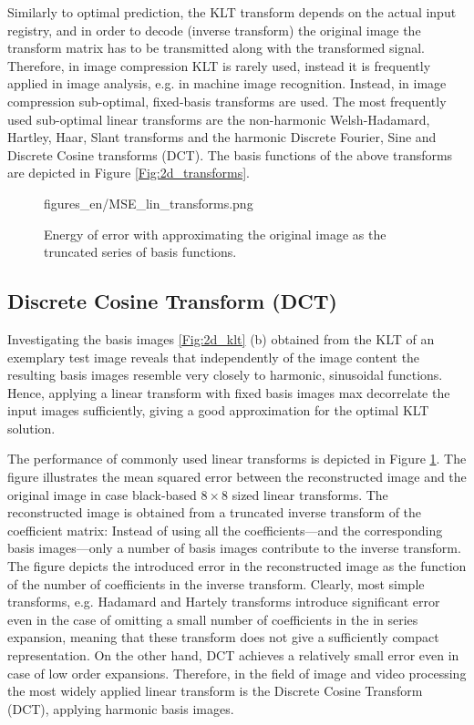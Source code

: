 \vspace{3mm}
Similarly to optimal prediction, the KLT transform depends on the actual input registry, and in order to decode (inverse transform) the original image the transform matrix has to be transmitted along with the transformed signal.
Therefore, in image compression KLT is rarely used, instead it is frequently applied in image analysis, e.g. in machine image recognition.
Instead, in image compression sub-optimal, fixed-basis transforms are used.
The most frequently used sub-optimal linear transforms are the non-harmonic Welsh-Hadamard, Hartley, Haar, Slant transforms and the harmonic Discrete Fourier, Sine and Discrete Cosine transforms (DCT).
The basis functions of the above transforms are depicted in Figure \ref{Fig:2d_transforms}.


\begin{figure}[h!]
	\centering
	\begin{overpic}[width = 0.8\columnwidth ]{figures_en/MSE_lin_transforms.png}
	\end{overpic}
	\caption{Energy of error with approximating the original image as the truncated series of basis functions.}
	\label{Fig:MSE}
\end{figure}

\subsection{Discrete Cosine Transform (DCT)}

Investigating the basis images \ref{Fig:2d_klt} (b) obtained from the KLT of an exemplary test image reveals that independently of the image content the resulting basis images resemble very closely to harmonic, sinusoidal functions.
Hence, applying a linear transform with fixed basis images max decorrelate the input images sufficiently, giving a good approximation for the optimal KLT solution.

The performance of commonly used linear transforms is depicted in Figure \ref{Fig:MSE}.
The figure illustrates the mean squared error between the reconstructed image and the original image in case black-based $8 \times 8$ sized linear transforms.
The reconstructed image is obtained from a truncated inverse transform of the coefficient matrix:
Instead of using all the coefficients---and the corresponding basis images---only a number of basis images contribute to the inverse transform.
The figure depicts the introduced error in the reconstructed image as the function of the number of coefficients in the inverse transform.
Clearly, most simple transforms, e.g. Hadamard and Hartely transforms introduce significant error even in the case of omitting a small number of coefficients in the in series expansion, meaning that these transform does not give a sufficiently compact representation.
On the other hand, DCT achieves a relatively small error even in case of low order expansions.
Therefore, in the field of image and video processing the most widely applied linear transform is the Discrete Cosine Transform (DCT), applying harmonic basis images.

